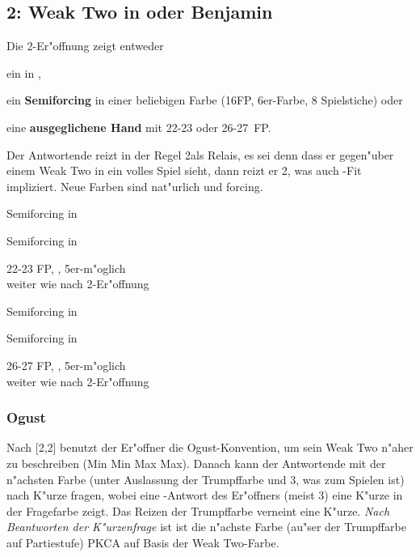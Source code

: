 \subsection{2\tre: Weak Two in \ka oder Benjamin}

Die 2\tre-Er"offnung zeigt entweder
\begin{compactitem}
\item ein  in \ka,
\item ein \textbf{Semiforcing} in einer beliebigen Farbe
  (16\pl FP, 6\pl{}er-Farbe, 8 Spielstiche) oder
\item eine \textbf{ausgeglichene Hand} mit 22-23 oder 26-27~FP.
\end{compactitem}
Der Antwortende reizt in der Regel 2\kar als Relais, es sei denn dass
er gegen"uber einem Weak Two in \ka ein volles Spiel sieht, dann reizt
er 2\SA, was auch \ka-Fit impliziert. Neue Farben sind nat"urlich und forcing.

\bdsc
\item[2\tre{}\sep2\kar;] \rel
  \bdsc
  \item[2\coe] Semiforcing in \co
  \item[2\pik] Semiforcing in \pi
  \item[2\SA] 22-23 FP, \bal, 5er-\ofa m"oglich \\
    \ra weiter wie nach 2\SA-Er"offnung
  \item[3\tre] Semiforcing in \tr
  \item[3\kar] Semiforcing in \ka
  \item[3\SA] 26-27 FP, \bal, 5er-\ofa m"oglich \\
    \ra weiter wie nach 2\SA-Er"offnung
  \edsc
\edsc

\subsubsection{Ogust} \label{ogust}

Nach [2\tre{}\sep2\SA{}] benutzt der Er"offner die Ogust-Konvention, um sein
Weak
Two n"aher zu beschreiben (Min Min Max Max). Danach kann der Antwortende mit der
n"achsten Farbe
(unter Auslassung der Trumpffarbe und 3\SA, was zum Spielen ist) nach K"urze
fragen, wobei eine \sa-Antwort des
Er"offners (meist 3\SA) eine K"urze in der Fragefarbe zeigt. Das Reizen der
Trumpffarbe verneint eine K"urze. \emph{Nach Beantworten der K"urzenfrage} ist
ist die n"achste Farbe (au"ser der Trumpffarbe auf Partiestufe) PKCA auf Basis
der Weak Two-Farbe.

